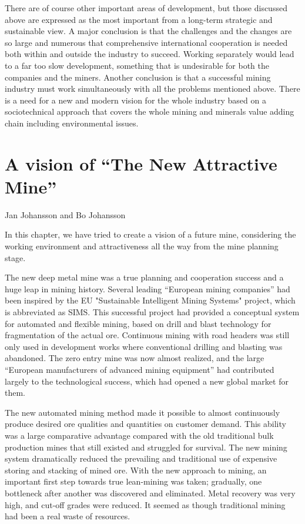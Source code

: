 \documentclass[
  12pt,
]{scrbook}
\newenvironment{chap-auth}
{\vspace{1cm}\begin{center}\begin{flushright}\sffamily\noindent}
  {\end{flushright}\end{center}\vspace{1cm}}
\begin{document}
There are of course other important areas of development, but those discussed above are expressed as the most important from a long-term strategic and sustainable view. A major conclusion is that the challenges and the changes are so large and numerous that comprehensive international cooperation is needed both within and outside the industry to succeed. Working separately would lead to a far too slow development, something that is undesirable for both the companies and the miners. Another conclusion is that a successful mining industry must work simultaneously with all the problems mentioned above. There is a need for a new and modern vision for the whole industry based on a sociotechnical approach that covers the whole mining and minerals value adding chain including environmental issues.

\hypertarget{a-vision-of-the-new-attractive-mine}{%
\chapter{A vision of ``The New Attractive Mine''}\label{a-vision-of-the-new-attractive-mine}}

\begin{chap-auth}
Jan Johansson and Bo Johansson
\end{chap-auth}

In this chapter, we have tried to create a vision of a future mine, considering the working environment and attractiveness all the way from the mine planning stage.

The new deep metal mine was a true planning and cooperation success and a huge leap in mining history. Several leading ``European mining companies'' had been inspired by the EU "Sustainable Intelligent Mining Systems" project, which is abbreviated as SIMS. This successful project had provided a conceptual system for automated and flexible mining, based on drill and blast technology for fragmentation of the actual ore. Continuous mining with road headers was still only used in development works where conventional drilling and blasting was abandoned. The zero entry mine was now almost realized, and the large ``European manufacturers of advanced mining equipment'' had contributed largely to the technological success, which had opened a new global market for them.

The new automated mining method made it possible to almost continuously produce desired ore qualities and quantities on customer demand. This ability was a large comparative advantage compared with the old traditional bulk production mines that still existed and struggled for survival. The new mining system dramatically reduced the prevailing and traditional use of expensive storing and stacking of mined ore. With the new approach to mining, an important first step towards true lean-mining was taken; gradually, one bottleneck after another was discovered and eliminated. Metal recovery was very high, and cut-off grades were reduced. It seemed as though traditional mining had been a real waste of resources.
\end{document}
